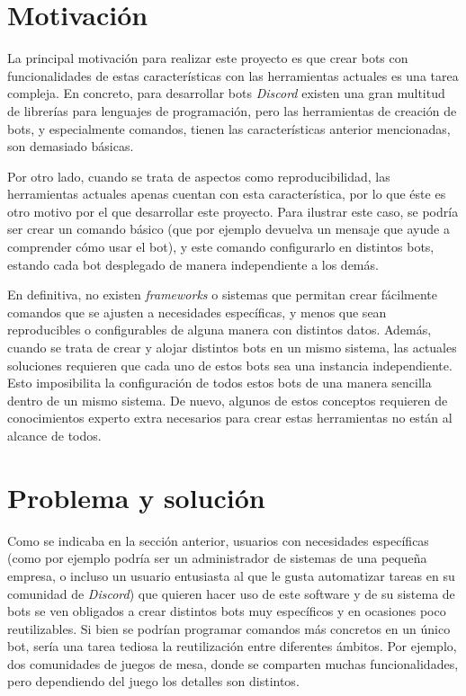 \section{Motivación}

La principal motivación para realizar este proyecto es que crear bots con funcionalidades de estas características con las herramientas actuales es una tarea compleja. En concreto, para desarrollar bots \textit{Discord} existen una gran multitud de librerías para lenguajes de programación, pero las herramientas de creación de bots, y especialmente comandos, tienen las características anterior mencionadas, son demasiado básicas.

Por otro lado, cuando se trata de aspectos como reproducibilidad, las herramientas actuales apenas cuentan con esta característica, por lo que éste es otro motivo por el que desarrollar este proyecto. Para ilustrar este caso, se podría ser crear un comando básico (que por ejemplo devuelva un mensaje que ayude a comprender cómo usar el bot), y este comando configurarlo en distintos bots, estando cada bot desplegado de manera independiente a los demás.

En definitiva, no existen \textit{frameworks} o sistemas que permitan crear fácilmente comandos que se ajusten a necesidades específicas, y menos que sean reproducibles o configurables de alguna manera con distintos datos. Además, cuando se trata de crear y alojar distintos bots en un mismo sistema, las actuales soluciones requieren que cada uno de estos bots sea una instancia independiente. Esto imposibilita la configuración de todos estos bots de una manera sencilla dentro de un mismo sistema. De nuevo, algunos de estos conceptos requieren de conocimientos experto extra necesarios para crear estas herramientas no están al alcance de todos.


\section{Problema y solución}

Como se indicaba en la sección anterior, usuarios con necesidades específicas (como por ejemplo podría ser un administrador de sistemas de una pequeña empresa, o incluso un usuario entusiasta al que le gusta automatizar tareas en su comunidad de \textit{Discord}) que quieren hacer uso de este software y de su sistema de bots se ven obligados a crear distintos bots muy específicos y en ocasiones poco reutilizables. Si bien se podrían programar comandos más concretos en un único bot, sería una tarea tediosa la reutilización entre diferentes ámbitos. Por ejemplo, dos comunidades de juegos de mesa, donde se comparten muchas funcionalidades, pero dependiendo del juego los detalles son distintos.

